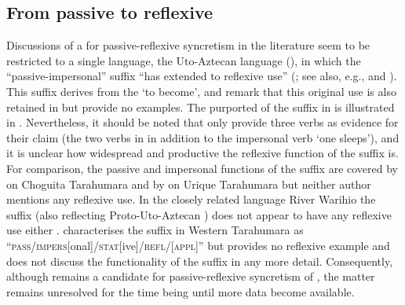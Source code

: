\subsection{From passive to reflexive} \label{diachrony:pass2refl}
Discussions of a  for passive-reflexive syncretism in the literature seem to be restricted to a single language, the Uto-Aztecan language  (), in which the “passive-impersonal” suffix  “has extended to reflexive use” (\citealt[803]{langacker:munro:1975}; see also, e.g., \citealt[18]{anderson:al:1976} and \citealt[252]{dik:1983}). This suffix derives from the    ‘to become’, and \citet[798]{langacker:munro:1975} remark that this original use is also retained in  but provide no examples. The purported  of the suffix in  is illustrated in . Nevertheless, it should be noted that \citeauthor{langacker:munro:1975} only provide three verbs as evidence for their claim (the two verbs in  in addition to the impersonal verb  ‘one sleeps’), and it is unclear how widespread and productive the reflexive function of the suffix  is. For comparison, the passive and impersonal functions of the suffix  are covered by \citet{caballero:2008} on Choguita Tarahumara and by \citet{jara:2013} on Urique Tarahumara but neither author mentions any reflexive use. In the closely related language River Warihio the suffix  (also reflecting Proto-Uto-Aztecan ) does not appear to have any reflexive use either \citep{armendariz:2006}. \citet[32]{burgess:1984} characterises the suffix  in Western Tarahumara as “\textsc{pass/impers}[onal]\textsc{/stat}[ive]\textsc{/refl/[appl]}” but provides no reflexive example and does not discuss the functionality of the suffix in any more detail. Consequently, although  remains a candidate for passive-reflexive syncretism of , the matter remains unresolved for the time being until more data become available.

